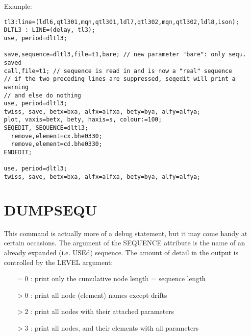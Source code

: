 Example:  
\begin{verbatim}
tl3:line=(ldl6,qtl301,mqn,qtl301,ldl7,qtl302,mqn,qtl302,ldl8,ison);
DLTL3 : LINE=(delay, tl3);
use, period=dltl3;

save,sequence=dltl3,file=t1,bare; // new parameter "bare": only sequ. saved
call,file=t1; // sequence is read in and is now a "real" sequence
// if the two preceding lines are suppressed, seqedit will print a warning
// and else do nothing
use, period=dltl3;
twiss, save, betx=bxa, alfx=alfxa, bety=bya, alfy=alfya;
plot, vaxis=betx, bety, haxis=s, colour:=100;
SEQEDIT, SEQUENCE=dltl3;
  remove,element=cx.bhe0330;
  remove,element=cd.bhe0330;
ENDEDIT;

use, period=dltl3;
twiss, save, betx=bxa, alfx=alfxa, bety=bya, alfy=alfya;
\end{verbatim}

\section{DUMPSEQU}
\label{sec:dumpsequ}
This command is actually more of a debug statement, but it may come handy at certain
occasions. The argument of the SEQUENCE attribute is the name of an
already expanded (i.e. USEd) sequence. The amount of detail in the
output is controlled by the LEVEL argument:
\begin{itemize}
\item[$=0$ : ]    print only the cumulative node length = sequence length
\item[$>0$ : ]    print all node (element) names except drifts
\item[$>2$ : ]    print all nodes with their attached parameters
\item[$>3$ : ]    print all nodes, and their elements with all parameters
\end{itemize}



